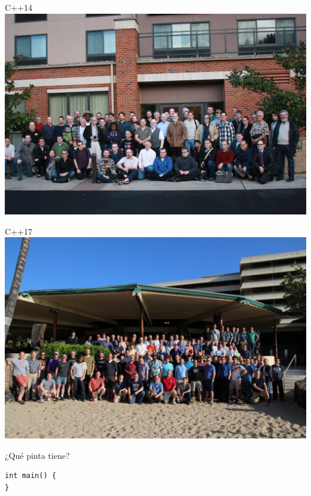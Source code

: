 \begin{frame}[t]{C++14}
\includegraphics[width=\textwidth]{img/cpp-14.jpg}
\end{frame}

\begin{frame}[t]{C++17}
\includegraphics[width=\textwidth]{img/cpp-17.jpg}
\end{frame}

\begin{frame}[t,fragile]{¿Qué pinta tiene?}
\begin{lstlisting}
int main() {
}
\end{lstlisting}
\end{frame}

